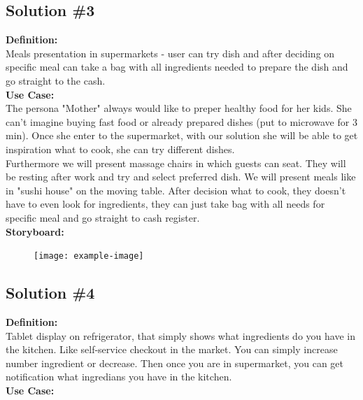 \documentclass[a4paper,10pt,oneside]{scrreprt}
\begin{document}
		\clearpage

		\subsection{Solution \#3}

		\noindent \textbf{Definition:}\\
			Meals presentation in supermarkets - user can try dish and after deciding on specific meal can take a bag with all ingredients needed to prepare the dish and go straight to the cash.\\

			\noindent \textbf{Use Case:}\\
			The persona "Mother" always would like to preper healthy food for her kids. She can't imagine buying fast food or
already prepared dishes (put to microwave for 3 min). Once she enter to the supermarket, with our solution she will
be able to get inspiration what to cook, she can try different dishes.\\

			Furthermore we will present massage chairs in which guests can seat. They will be resting after work and try and select preferred dish. We will present meals like in "sushi house" on the moving table. After decision what to cook, they doesn't have to
even look for ingredients, they can just take bag with all needs for specific meal and go straight to cash register.\\

			\noindent \textbf{Storyboard:}\\

			\begin{figure}[H]
				\centering
				\texttt{[image: example-image]}
			\end{figure}

		\subsection{Solution \#4}

		\noindent \textbf{Definition:}\\
			Tablet display on refrigerator, that simply shows what ingredients do you have in the kitchen. Like self-service checkout
in the market. You can simply increase number ingredient or decrease. Then once you are in supermarket, you can get notification what ingredians you have in the kitchen.\\

			\noindent \textbf{Use Case:}\\
			\\
\end{document}
